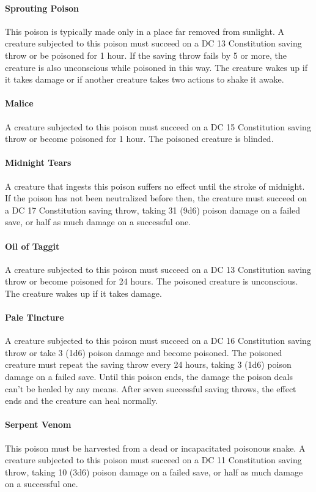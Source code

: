     \paragraph{Sprouting Poison}
        This poison is typically made only in a place far removed from sunlight.
        A creature subjected to this poison must succeed on a DC 13 Constitution saving throw or be poisoned for 1 hour.
        If the saving throw fails by 5 or more, the creature is also unconscious while poisoned in this way.
        The creature wakes up if it takes damage or if another creature takes two actions to shake it awake.
    \paragraph{Malice}
        A creature subjected to this poison must succeed on a DC 15 Constitution saving throw or become poisoned for 1 hour.
        The poisoned creature is blinded.
    \paragraph{Midnight Tears}
        A creature that ingests this poison suffers no effect until the stroke of midnight.
        If the poison has not been neutralized before then, the creature must succeed on a DC 17 Constitution saving throw, taking 31 (9d6) poison damage on a failed save, or half as much damage on a successful one.
    \paragraph{Oil of Taggit}
        A creature subjected to this poison must succeed on a DC 13 Constitution saving throw or become poisoned for 24 hours.
        The poisoned creature is unconscious.
        The creature wakes up if it takes damage.
    \paragraph{Pale Tincture}
        A creature subjected to this poison must succeed on a DC 16 Constitution saving throw or take 3 (1d6) poison damage and become poisoned.
        The poisoned creature must repeat the saving throw every 24 hours, taking 3 (1d6) poison damage on a failed save.
        Until this poison ends, the damage the poison deals can't be healed by any means.
        After seven successful saving throws, the effect ends and the creature can heal normally.
    \paragraph{Serpent Venom}
        This poison must be harvested from a dead or incapacitated poisonous snake.
        A creature subjected to this poison must succeed on a DC 11 Constitution saving throw, taking 10 (3d6) poison damage on a failed save, or half as much damage on a successful one.
